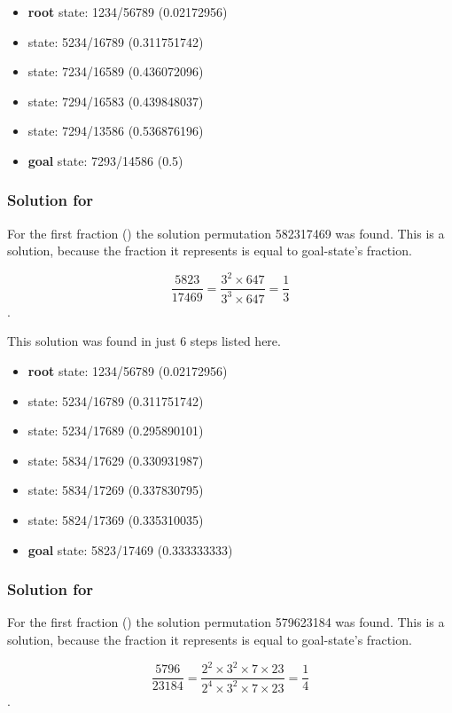 \documentclass{article}
\begin{document}
\begin{itemize}
  \item \textbf{root} state: 1234/56789 (0.02172956) 
  \item state: 5234/16789 (0.311751742)
  \item state: 7234/16589 (0.436072096)
  \item state: 7294/16583 (0.439848037)
  \item state: 7294/13586 (0.536876196)
  \item \textbf{goal} state: 7293/14586 (0.5)
\end{itemize}

\subsubsection{Solution for }

For the first fraction () the solution permutation 582317469 was
found. This is a solution, because the fraction it represents is equal to
goal-state's fraction.

\[\frac{5823}{17469} = \frac{3^2 \times 647}{3^3 \times 647} =
\frac{1}{3}\].

This solution was found in just 6 steps listed here.

\begin{itemize}
  \item \textbf{root} state: 1234/56789 (0.02172956) 
  \item state: 5234/16789 (0.311751742)
  \item state: 5234/17689 (0.295890101)
  \item state: 5834/17629 (0.330931987)
  \item state: 5834/17269 (0.337830795)
  \item state: 5824/17369 (0.335310035)
  \item \textbf{goal} state: 5823/17469 (0.333333333)
\end{itemize}

\subsubsection{Solution for }

For the first fraction () the solution permutation 579623184 was
found. This is a solution, because the fraction it represents is equal to
goal-state's fraction.

\[\frac{5796}{23184} = \frac{2^2 \times 3^2 \times 7 \times 23}{2^4 \times 3^2 \times 7 \times 23}
= \frac{1}{4}\].
\end{document}
